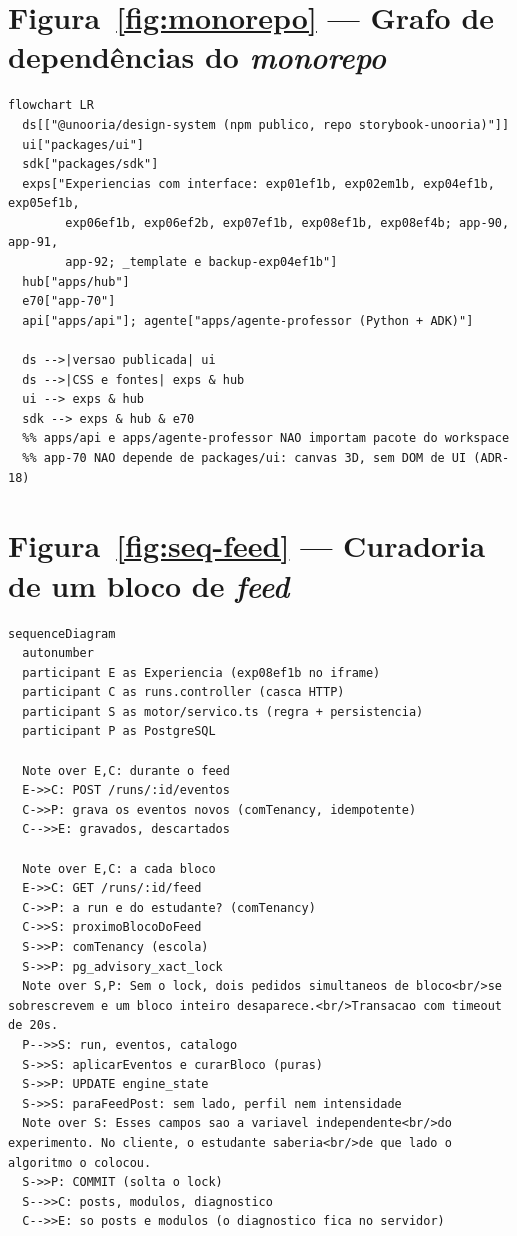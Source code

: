 \section{Figura~\ref{fig:monorepo} --- Grafo de dependências do \emph{monorepo}}

\begin{lstlisting}[language=mermaid]
flowchart LR
  ds[["@unooria/design-system (npm publico, repo storybook-unooria)"]]
  ui["packages/ui"]
  sdk["packages/sdk"]
  exps["Experiencias com interface: exp01ef1b, exp02em1b, exp04ef1b, exp05ef1b,
        exp06ef1b, exp06ef2b, exp07ef1b, exp08ef1b, exp08ef4b; app-90, app-91,
        app-92; _template e backup-exp04ef1b"]
  hub["apps/hub"]
  e70["app-70"]
  api["apps/api"]; agente["apps/agente-professor (Python + ADK)"]

  ds -->|versao publicada| ui
  ds -->|CSS e fontes| exps & hub
  ui --> exps & hub
  sdk --> exps & hub & e70
  %% apps/api e apps/agente-professor NAO importam pacote do workspace
  %% app-70 NAO depende de packages/ui: canvas 3D, sem DOM de UI (ADR-18)
\end{lstlisting}

\section{Figura~\ref{fig:seq-feed} --- Curadoria de um bloco de \emph{feed}}

\begin{lstlisting}[language=mermaid]
sequenceDiagram
  autonumber
  participant E as Experiencia (exp08ef1b no iframe)
  participant C as runs.controller (casca HTTP)
  participant S as motor/servico.ts (regra + persistencia)
  participant P as PostgreSQL

  Note over E,C: durante o feed
  E->>C: POST /runs/:id/eventos
  C->>P: grava os eventos novos (comTenancy, idempotente)
  C-->>E: gravados, descartados

  Note over E,C: a cada bloco
  E->>C: GET /runs/:id/feed
  C->>P: a run e do estudante? (comTenancy)
  C->>S: proximoBlocoDoFeed
  S->>P: comTenancy (escola)
  S->>P: pg_advisory_xact_lock
  Note over S,P: Sem o lock, dois pedidos simultaneos de bloco<br/>se sobrescrevem e um bloco inteiro desaparece.<br/>Transacao com timeout de 20s.
  P-->>S: run, eventos, catalogo
  S->>S: aplicarEventos e curarBloco (puras)
  S->>P: UPDATE engine_state
  S->>S: paraFeedPost: sem lado, perfil nem intensidade
  Note over S: Esses campos sao a variavel independente<br/>do experimento. No cliente, o estudante saberia<br/>de que lado o algoritmo o colocou.
  S->>P: COMMIT (solta o lock)
  S-->>C: posts, modulos, diagnostico
  C-->>E: so posts e modulos (o diagnostico fica no servidor)
\end{lstlisting}

